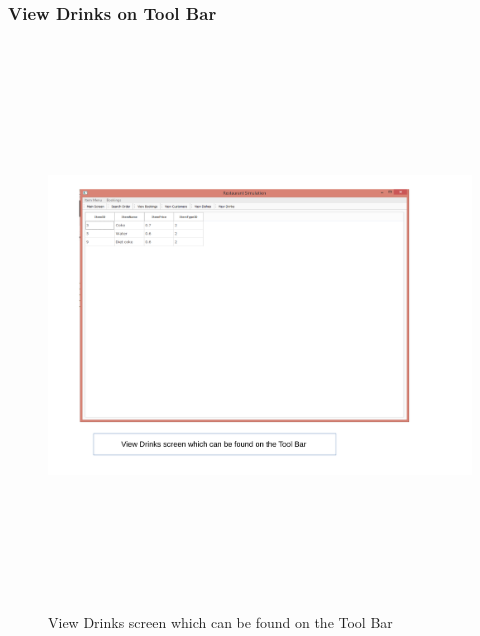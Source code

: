 \begin{landscape}
\subsubsection{View Drinks on Tool Bar}
\begin{figure}[H]
    \includegraphics[height = 15cm]{./Maintenance/images/screen21}
    \caption{View Drinks screen which can be found on the Tool Bar} \label{fig:screen21}
\end{figure}
\end{landscape}


